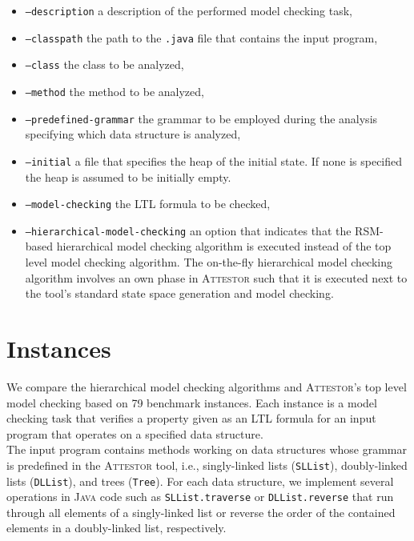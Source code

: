 \documentclass[a4paper, 12pt, twoside]{report}
\begin{document}
	\begin{itemize}
		\item \texttt{--description} a description of the performed model checking task,
		\item \texttt{--classpath} the path to the \texttt{.java} file that contains the input program,
		\item \texttt{--class} the class to be analyzed,
		\item \texttt{--method} the method to be analyzed,
		\item \texttt{--predefined-grammar} the grammar to be employed during the analysis specifying which data structure is analyzed,
		\item \texttt{--initial} a file that specifies the heap of the initial state. If none is specified the heap is assumed to be initially empty.
		\item \texttt{--model-checking} the LTL formula to be checked,
		\item \texttt{--hierarchical-model-checking} an option that indicates that the RSM-based hierarchical model checking algorithm is executed instead of the top level model checking algorithm. The on-the-fly hierarchical model checking algorithm involves an own phase in \textsc{Attestor} such that it is executed next to the tool's standard state space generation and model checking. 
	\end{itemize} 
	
	\section{Instances}
	
	We compare the hierarchical model checking algorithms and \textsc{Attestor}'s top level model checking based on 79 benchmark instances. Each instance is a model checking task that verifies a property given as an LTL formula for an input program that operates on a specified data structure.\\	
		
	The input program contains methods working on data structures whose grammar is predefined in the \textsc{Attestor} tool, i.e., singly-linked lists (\texttt{SLList}), doubly-linked lists (\texttt{DLList}), and trees (\texttt{Tree}). For each data structure, we implement several operations in \textsc{Java} code such as \texttt{SLList.traverse} or \texttt{DLList.reverse} that run through all elements of a singly-linked list or reverse the order of the contained elements in a doubly-linked list, respectively.\\
	
\end{document}
